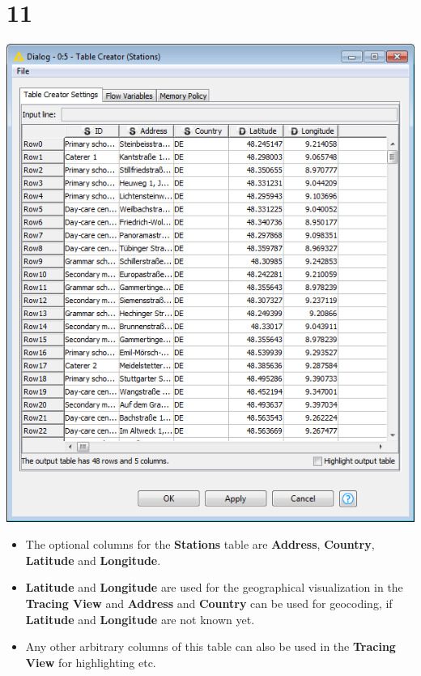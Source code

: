 \documentclass[10pt]{beamer}
\begin{document}
\section{11}
\begin{frame}
	\begin{center}
  		\includegraphics[height=0.5\textheight]{11.png}
	\end{center}
	\begin{itemize}
		\item The optional columns for the \textbf{Stations} table are \textbf{Address}, \textbf{Country}, \textbf{Latitude} and \textbf{Longitude}.
		\item \textbf{Latitude} and \textbf{Longitude} are used for the geographical visualization in the \textbf{Tracing View} and \textbf{Address} and \textbf{Country} can be used for geocoding, if \textbf{Latitude} and \textbf{Longitude} are not known yet.
		\item Any other arbitrary columns of this table can also be used in the \textbf{Tracing View} for highlighting etc.
	\end{itemize}
\end{frame}
\end{document}
